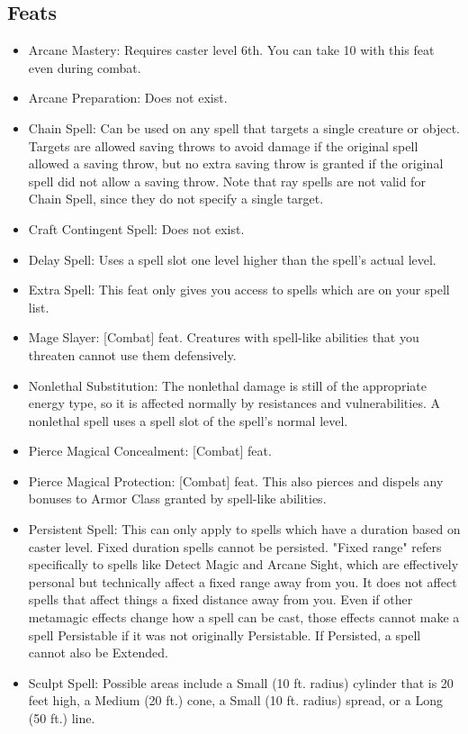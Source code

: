 \subsection{Feats}
\begin{itemize}
\item Arcane Mastery: Requires caster level 6th. You can take 10 with this feat even during combat.
\item Arcane Preparation: Does not exist.
\item Chain Spell: Can be used on any spell that targets a single creature or object. Targets are allowed saving throws to avoid damage if the original spell allowed a saving throw, but no extra saving throw is granted if the original spell did not allow a saving throw. Note that ray spells are not valid for Chain Spell, since they do not specify a single target.
\item Craft Contingent Spell: Does not exist.
\item Delay Spell: Uses a spell slot one level higher than the spell's actual level.
\item Extra Spell: This feat only gives you access to spells which are on your spell list.
\item Mage Slayer: [Combat] feat. Creatures with spell-like abilities that you threaten cannot use them defensively.
\item Nonlethal Substitution: The nonlethal damage is still of the appropriate energy type, so it is affected normally by resistances and vulnerabilities. A nonlethal spell uses a spell slot of the spell's normal level.
\item Pierce Magical Concealment: [Combat] feat.
\item Pierce Magical Protection: [Combat] feat. This also pierces and dispels any bonuses to Armor Class granted by spell-like abilities.
\item Persistent Spell: This can only apply to spells which have a duration based on caster level. Fixed duration spells cannot be persisted. "Fixed range" refers specifically to spells like Detect Magic and Arcane Sight, which are effectively personal but technically affect a fixed range away from you. It does not affect spells that affect things a fixed distance away from you. Even if other metamagic effects change how a spell can be cast, those effects cannot make a spell Persistable if it was not originally Persistable. If Persisted, a spell cannot also be Extended.
\item Sculpt Spell: Possible areas include a Small (10 ft. radius) cylinder that is 20 feet high, a Medium (20 ft.) cone, a Small (10 ft. radius) spread, or a Long (50 ft.) line.
\end{itemize}

